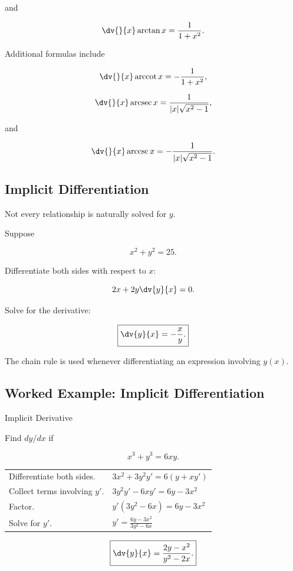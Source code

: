 and

\[ \dv{}{x}\arctan x=\frac1{1+x^2}. \]

Additional formulas include

\[ \dv{}{x}\operatorname{arccot}x=-\frac1{1+x^2}, \]

\[ \dv{}{x}\operatorname{arcsec}x
=\frac1{|x|\sqrt{x^2-1}}, \]

and

\[ \dv{}{x}\operatorname{arccsc}x
=-\frac1{|x|\sqrt{x^2-1}}. \]

\subsection{Implicit Differentiation}
\label{subsec:implicit-differentiation}

Not every relationship is naturally solved for \(y\).

Suppose

\[ x^2+y^2=25. \]

Differentiate both sides with respect to \(x\):

\[ 2x+2y\dv{y}{x}=0. \]

Solve for the derivative:

\[ \boxed{\dv{y}{x}=-\frac{x}{y}.} \]

The chain rule is used whenever differentiating an expression involving
\(y(x)\).

\subsection{Worked Example: Implicit Differentiation}
\label{subsec:worked-implicit}

\begin{workedexamplebox}{Implicit Derivative}

Find \(dy/dx\) if

\[ x^3+y^3=6xy. \]

\begin{tabularx}{\textwidth}{@{}>{\raggedright\arraybackslash}p{}X@{}}
Differentiate both sides. &
\(3x^2+3y^2y'=6(y+xy')\)\\
Collect terms involving \(y'\). &
\(3y^2y'-6xy'=6y-3x^2\)\\
Factor. &
\(y'(3y^2-6x)=6y-3x^2\)\\
Solve for \(y'\). &
\(\displaystyle y'=\frac{6y-3x^2}{3y^2-6x}\)
\end{tabularx}

\begin{answerbox}
\[ \boxed{\dv{y}{x}=\frac{2y-x^2}{y^2-2x}.} \]
\end{answerbox}
\end{workedexamplebox}

